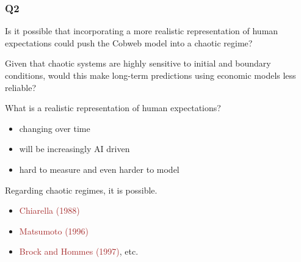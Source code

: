 \documentclass[
    xcolor={svgnames,dvipsnames},
    hyperref={colorlinks, citecolor=DeepPink4, linkcolor=DarkRed, urlcolor=DarkBlue}
    ]{beamer}  %
\newcommand{\brown}[1]{\textcolor{Brown}{\sf #1}}
\newcommand{\1}{\mathbbm 1}
\begin{document}
\begin{frame}
    \frametitle{Q2}
    
    Is it possible that incorporating a more realistic representation of human
    expectations could push the Cobweb model into a chaotic regime? 

            \vspace{0.3em}
            \vspace{0.3em}
            \vspace{0.3em}
    Given that chaotic systems are highly sensitive to initial and boundary
    conditions, would this make long-term predictions using economic models
    less reliable?

\end{frame}

\begin{frame}

    What is a realistic representation of human expectations?

    \begin{itemize}
        \item changing over time
            \vspace{0.3em}
        \item will be increasingly AI driven
            \vspace{0.3em}
        \item hard to measure and even harder to model
    \end{itemize}
    
            \vspace{0.3em}
            \vspace{0.3em}
            \vspace{0.3em}
    Regarding chaotic regimes, it is possible.

    \begin{itemize}
        \item \brown{Chiarella (1988)}
            \vspace{0.3em}
        \item \brown{Matsumoto (1996)}
            \vspace{0.3em}
        \item \brown{Brock and Hommes (1997)}, etc.
    \end{itemize}

\end{frame}
\end{document}
